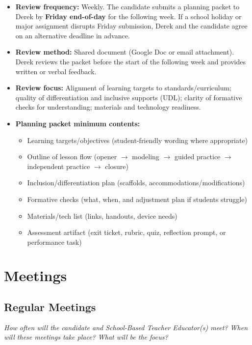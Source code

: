 \documentclass[10pt]{article}
\begin{document}
\begin{itemize}[leftmargin=*,itemsep=0.25em]
  \item \textbf{Review frequency:} Weekly. The candidate submits a planning packet to Derek by \textbf{Friday end-of-day} for the following week. If a school holiday or major assignment disrupts Friday submission, Derek and the candidate agree on an alternative deadline in advance.
  \item \textbf{Review method:} Shared document (Google Doc or email attachment). Derek reviews the packet before the start of the following week and provides written or verbal feedback.
  \item \textbf{Review focus:} Alignment of learning targets to standards/curriculum; quality of differentiation and inclusive supports (UDL); clarity of formative checks for understanding; materials and technology readiness.
  \item \textbf{Planning packet minimum contents:}
  \begin{itemize}[leftmargin=1.5em,itemsep=0.15em]
    \item Learning targets/objectives (student-friendly wording where appropriate)
    \item Outline of lesson flow (opener $\to$ modeling $\to$ guided practice $\to$ independent practice $\to$ closure)
    \item Inclusion/differentiation plan (scaffolds, accommodations/modifications)
    \item Formative checks (what, when, and adjustment plan if students struggle)
    \item Materials/tech list (links, handouts, device needs)
    \item Assessment artifact (exit ticket, rubric, quiz, reflection prompt, or performance task)
  \end{itemize}
\end{itemize}

\newpage

\section{Meetings}

\subsection{Regular Meetings}
\textit{How often will the candidate and School-Based Teacher Educator(s) meet? When will these meetings take place? What will be the focus?}
\end{document}
